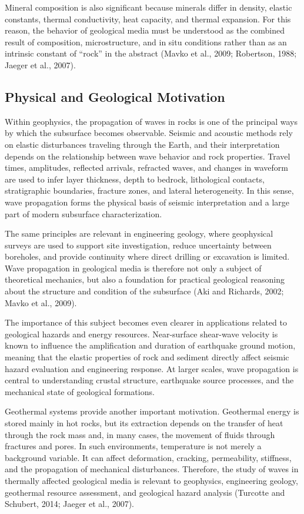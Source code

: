 \documentclass[12pt]{article}
\begin{document}
Mineral composition is also significant because minerals differ in density, elastic constants, thermal conductivity, heat capacity, and thermal expansion. For this reason, the behavior of geological media must be understood as the combined result of composition, microstructure, and in situ conditions rather than as an intrinsic constant of ``rock'' in the abstract (Mavko et al., 2009; Robertson, 1988; Jaeger et al., 2007).

\subsection{Physical and Geological Motivation}

Within geophysics, the propagation of waves in rocks is one of the principal ways by which the subsurface becomes observable. Seismic and acoustic methods rely on elastic disturbances traveling through the Earth, and their interpretation depends on the relationship between wave behavior and rock properties. Travel times, amplitudes, reflected arrivals, refracted waves, and changes in waveform are used to infer layer thickness, depth to bedrock, lithological contacts, stratigraphic boundaries, fracture zones, and lateral heterogeneity. In this sense, wave propagation forms the physical basis of seismic interpretation and a large part of modern subsurface characterization.

The same principles are relevant in engineering geology, where geophysical surveys are used to support site investigation, reduce uncertainty between boreholes, and provide continuity where direct drilling or excavation is limited. Wave propagation in geological media is therefore not only a subject of theoretical mechanics, but also a foundation for practical geological reasoning about the structure and condition of the subsurface (Aki and Richards, 2002; Mavko et al., 2009).

The importance of this subject becomes even clearer in applications related to geological hazards and energy resources. Near-surface shear-wave velocity is known to influence the amplification and duration of earthquake ground motion, meaning that the elastic properties of rock and sediment directly affect seismic hazard evaluation and engineering response. At larger scales, wave propagation is central to understanding crustal structure, earthquake source processes, and the mechanical state of geological formations.

Geothermal systems provide another important motivation. Geothermal energy is stored mainly in hot rocks, but its extraction depends on the transfer of heat through the rock mass and, in many cases, the movement of fluids through fractures and pores. In such environments, temperature is not merely a background variable. It can affect deformation, cracking, permeability, stiffness, and the propagation of mechanical disturbances. Therefore, the study of waves in thermally affected geological media is relevant to geophysics, engineering geology, geothermal resource assessment, and geological hazard analysis (Turcotte and Schubert, 2014; Jaeger et al., 2007).
\end{document}
